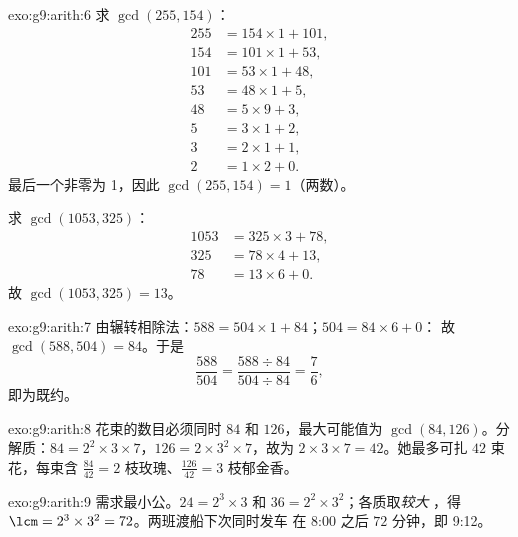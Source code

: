 \begin{solution}{exo:g9:arith:6}
求 $\gcd(255, 154)$：
\begin{align*}
255 &= 154 \times 1 + 101, \\
154 &= 101 \times 1 + 53, \\
101 &= 53 \times 1 + 48, \\
53 &= 48 \times 1 + 5, \\
48 &= 5 \times 9 + 3, \\
5 &= 3 \times 1 + 2, \\
3 &= 2 \times 1 + 1, \\
2 &= 1 \times 2 + 0 .
\end{align*}
最后一个非零为 1，因此 $\gcd(255, 154) = 1$（两数）。

求 $\gcd(1053, 325)$：
\begin{align*}
1053 &= 325 \times 3 + 78, \\
325 &= 78 \times 4 + 13, \\
78 &= 13 \times 6 + 0 .
\end{align*}
故 $\gcd(1053, 325) = 13$。
\end{solution}

\begin{solution}{exo:g9:arith:7}
由辗转相除法：$588 = 504 \times 1 + 84$；$504 = 84 \times 6 + 0$：
故 $\gcd(588, 504) = 84$。于是
\[
\frac{588}{504} = \frac{588 \div 84}{504 \div 84} = \frac{7}{6},
\]
即为既约。
\end{solution}

\begin{solution}{exo:g9:arith:8}
花束的数目必须同时 $84$ 和 $126$，最大可能值为
$\gcd(84, 126)$。分解质：$84 = 2^2 \times 3 \times
7$，$126 = 2 \times 3^2 \times 7$，故为 $2 \times 3 \times 7 =
42$。她最多可扎 $42$ 束花，每束含
$\frac{84}{42} = 2$ 枝玫瑰、$\frac{126}{42} = 3$ 枝郁金香。
\end{solution}

\begin{solution}{exo:g9:arith:9}
需求最小公。$24 = 2^3 \times 3$ 和
$36 = 2^2 \times 3^2$；各质取\emph{较大}
，得 $\lcm = 2^3 \times 3^2 = 72$。两班渡船下次同时发车
在 8:00 之后 $72$ 分钟，即 9:12。
\end{solution}

